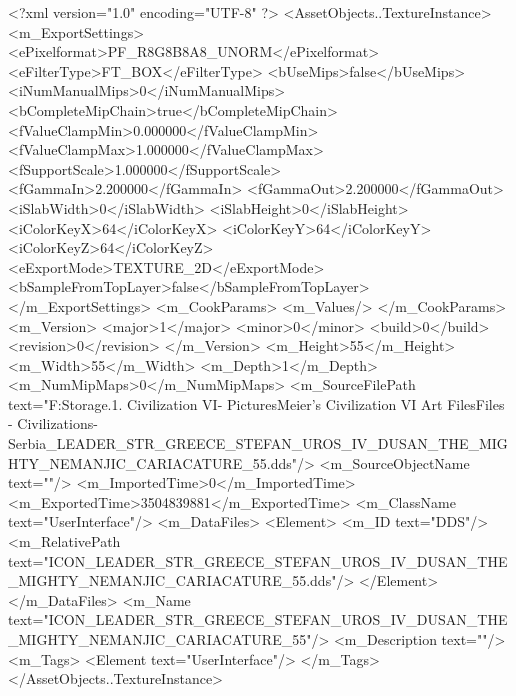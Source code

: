 <?xml version="1.0" encoding="UTF-8" ?>
<AssetObjects..TextureInstance>
	<m_ExportSettings>
		<ePixelformat>PF_R8G8B8A8_UNORM</ePixelformat>
		<eFilterType>FT_BOX</eFilterType>
		<bUseMips>false</bUseMips>
		<iNumManualMips>0</iNumManualMips>
		<bCompleteMipChain>true</bCompleteMipChain>
		<fValueClampMin>0.000000</fValueClampMin>
		<fValueClampMax>1.000000</fValueClampMax>
		<fSupportScale>1.000000</fSupportScale>
		<fGammaIn>2.200000</fGammaIn>
		<fGammaOut>2.200000</fGammaOut>
		<iSlabWidth>0</iSlabWidth>
		<iSlabHeight>0</iSlabHeight>
		<iColorKeyX>64</iColorKeyX>
		<iColorKeyY>64</iColorKeyY>
		<iColorKeyZ>64</iColorKeyZ>
		<eExportMode>TEXTURE_2D</eExportMode>
		<bSampleFromTopLayer>false</bSampleFromTopLayer>
	</m_ExportSettings>
	<m_CookParams>
		<m_Values/>
	</m_CookParams>
	<m_Version>
		<major>1</major>
		<minor>0</minor>
		<build>0</build>
		<revision>0</revision>
	</m_Version>
	<m_Height>55</m_Height>
	<m_Width>55</m_Width>
	<m_Depth>1</m_Depth>
	<m_NumMipMaps>0</m_NumMipMaps>
	<m_SourceFilePath text="F:\Mod Storage\2.1. Civilization VI\Mods\Archive - Pictures\Sid Meier's Civilization VI Art Files\Art Files - Civilizations\Civilization - Serbia\ICON_LEADER_STR_GREECE_STEFAN_UROS_IV_DUSAN_THE_MIGHTY_NEMANJIC_CARIACATURE_55.dds"/>
	<m_SourceObjectName text=""/>
	<m_ImportedTime>0</m_ImportedTime>
	<m_ExportedTime>3504839881</m_ExportedTime>
	<m_ClassName text="UserInterface"/>
	<m_DataFiles>
		<Element>
			<m_ID text="DDS"/>
			<m_RelativePath text="ICON_LEADER_STR_GREECE_STEFAN_UROS_IV_DUSAN_THE_MIGHTY_NEMANJIC_CARIACATURE_55.dds"/>
		</Element>
	</m_DataFiles>
	<m_Name text="ICON_LEADER_STR_GREECE_STEFAN_UROS_IV_DUSAN_THE_MIGHTY_NEMANJIC_CARIACATURE_55"/>
	<m_Description text=""/>
	<m_Tags>
		<Element text="UserInterface"/>
	</m_Tags>
</AssetObjects..TextureInstance>

